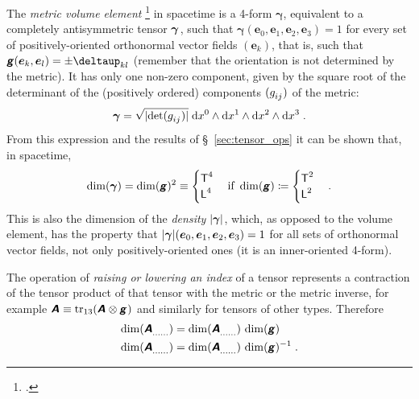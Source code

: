 \documentclass[\ifafour a4paper,12pt,\else a5paper,10pt,\fi%
onecolumn,oneside,article,%
british%
]{memoir}
\makeatletter
\theoremstyle{remark}
\theoremstyle{innote}
\newcommand*{\mathte}[1]{\textbf{\textit{\textsf{#1}}}}
\newcommand*{\citep}{\footcites}
\newcommand*{\delt}{\deltaup}%
\newcommand*{\di}{\mathrm{d}}%
\DeclareMathOperator{\tr}{tr}%
\newcommand*{\defd}{\coloneqq}
\DeclarePairedDelimiter\abs{\lvert}{\rvert}
\renewcommand*{\|}[1][]{\nonscript\,#1\vert\nonscript\;\mathopen{}}
\newcommand*{\sect}{\S}%
\newcommand*{\q}{}%
\DeclareRobustCommand*{\q}{%
  \mathbin{\mathpalette\bigcdot@{}}%
}
\newcommand*{\bigcdot@scalefactor}{0.7}
\newcommand*{\bigcdot@widthfactor}{1.5}
\newcommand*{\bigcdot@}[2]{%
  \sbox0{$#1\vcenter{}$}%
  \sbox2{$#1\cdot\m@th$}%
  \hbox to \bigcdot@widthfactor\wd2{%
    \hfil
    \raise\ht0\hbox{%
      \scalebox{\bigcdot@scalefactor}{%
        \lower\ht0\hbox{$#1\bullet\m@th$}%
      }%
    }%
    \hfil
  }%
}
\newcommand*{\Le}{\textsf{L}}
\newcommand*{\Ti}{\textsf{T}}
\newcommand*{\yA}{\mathte{A}}
\newcommand*{\yg}{\mathte{g}}
\renewcommand*{\i}{\indices}
\newcommand*{\dix}[1][i]{\di x^{#1}}
\newcommand*{\ye}{\bm{e}}
\newcommand*{\ygv}{\bm{\gamma}}
\makeatother
\begin{document}
\medskip

The \emph{metric volume element} \citep[\sect~6.2]{abrahametal1983_r1988}
in spacetime is a 4-form $\ygv$, equivalent to a completely antisymmetric
tensor $\ygv\i{_{\q\q\q\q}}$, such that
$\ygv(\ye_{0},\ye_{1},\ye_{2},\ye_{3})=1$ for every set of
positively-oriented orthonormal vector fields $(\ye_{k})$, that is, such
that $\yg(\ye_{k},\ye_{l})=\pm\delt_{kl}$ (remember that the orientation is
not determined by the metric). It has only one non-zero 
component, given by the square root of the determinant of the (positively
ordered) components $(g\i{_{ij}})$ of the metric:
\begin{equation}
  \label{eq:volume_elem}
  \ygv =
  \sqrt{\smash[b]{\abs{\det(g\i{_{ij}})}}}\;\dix[0]\land\dix[1]\land\dix[2]\land\dix[3] \;.
\end{equation}
From this expression and the results of \sect~\ref{sec:tensor_ops} it can
be shown that, in spacetime,
\begin{equation}
  \label{eq:dim_volume_elem}
  \dim(\ygv) = \dim(\yg)^{2} \equiv
    \begin{cases}
    \Ti^{4} \\
    \Le^{4}
  \end{cases}
  \text{if }\dim(\yg)\defd
  \begin{cases}
     \Ti^2 \\
    \Le^2
  \end{cases}.
\end{equation}
This is also the dimension of the \emph{density} $\abs{\ygv}$, which, as
opposed to the volume element, has the property that
$\abs{\ygv}(\ye_{0},\ye_{1},\ye_{2},\ye_{3})=1$ for all sets of orthonormal
vector fields, not only positively-oriented ones (it is an inner-oriented
4-form).

\medskip

The operation of \emph{raising or lowering an index} of a tensor represents a
contraction of the tensor product of that tensor with the metric or the
metric inverse, for example
$\yA\i{_{\q\q}} \equiv
\tr_{13}(\yA\i{^{\q}_{\q}}\otimes\yg\i{_{\q\q}})$ and similarly
for tensors of other types. Therefore
\begin{equation}
  \label{eq:raising_lowering}
  \begin{split}
  \dim(\yA\i{_{\dotso}_{\q}_{\dotso}}) &=
  \dim(\yA\i{_{\dotso}^{\q}_{\dotso}})\,\dim(\yg)
\\
  \dim(\yA\i{_{\dotso}^{\q}_{\dotso}}) &=
  \dim(\yA\i{_{\dotso}_{\q}_{\dotso}})\,\dim(\yg)^{-1} \;.
\end{split}
\end{equation}
\end{document}
